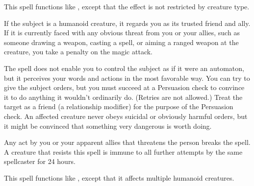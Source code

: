 \begin{spellsuccess}
    This spell functions like , except that the effect is not restricted by creature type.
\end{spellsuccess}

\spelldur{\durlong}
\begin{spellsuccess}
    If the subject is a humanoid creature, it regards you as its trusted friend and ally. If it is currently faced with any obvious threat from you or your allies, such as someone drawing a weapon, casting a spell, or aiming a ranged weapon at the creature, you take a  penalty on the magic attack.
    \par The spell does not enable you to control the subject as if it were an automaton, but it perceives your words and actions in the most favorable way. You can try to give the subject orders, but you must succeed at a Persuasion check to convince it to do anything it wouldn't ordinarily do. (Retries are not allowed.) Treat the target as a friend (a  relationship modifier) for the purpose of the Persuasion check. An affected creature never obeys suicidal or obviously harmful orders, but it might be convinced that something very dangerous is worth doing.
\end{spellsuccess}
\begin{spellnotes}
    Any act by you or your apparent allies that threatens the  person breaks the spell. A creature that resists this spell is immune to all further attempts by the same spellcaster for 24 hours.
\end{spellnotes}

\begin{spellsuccess}
    This spell functions like , except that it affects multiple humanoid creatures.
\end{spellsuccess}

